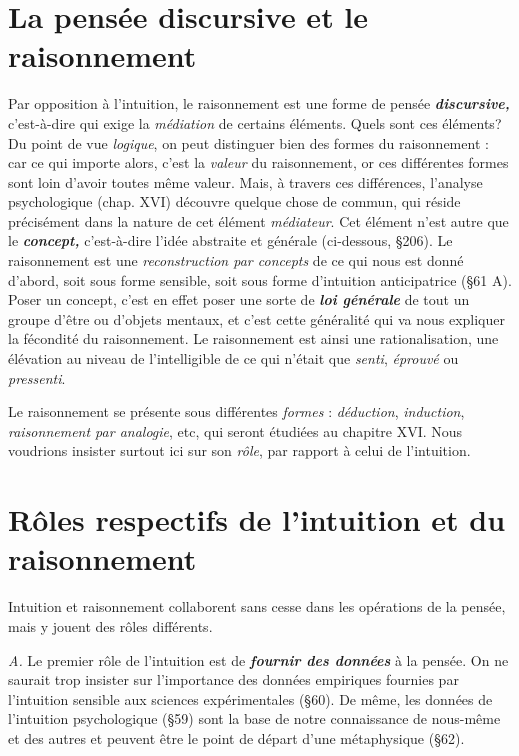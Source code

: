 \section{La pensée discursive et le raisonnement}%
Par opposition
à l'intuition, le raisonnement est une forme de pensée \textbf{\textit {discursive,}}
c’est-à-dire qui exige la {\it médiation} de certains éléments. Quels sont
ces éléments? Du point de vue {\it logique}, on peut distinguer bien des
formes du raisonnement : car ce qui importe alors, c’est la {\it valeur} du
raisonnement, or ces différentes formes sont loin d’avoir toutes même
valeur. Mais, à travers ces différences, l’analyse psychologique
(chap. XVI) découvre quelque chose de commun, qui réside précisément
dans la nature de cet élément {\it médiateur}. Cet élément n’est autre
que le \textbf{\textit {concept,}} c'est-à-dire l’idée abstraite et générale (ci-dessous,
\S 206). Le raisonnement est une {\it reconstruction par concepts} de ce qui
nous est donné d’abord, soit sous forme sensible, soit sous forme d’intuition
anticipatrice (\S 61 A). Poser un concept, c’est en effet poser une
sorte de \textbf{\textit {loi générale}} de tout un groupe d’être ou d’objets mentaux, et
c’est cette généralité qui va nous expliquer la fécondité du raisonnement.
Le raisonnement est ainsi une rationalisation, une élévation au
niveau de l’intelligible de ce qui n’était que {\it senti}, {\it éprouvé} ou {\it pressenti}.

Le raisonnement se présente sous différentes {\it formes} : {\it déduction},
{\it induction}, {\it raisonnement par analogie}, etc, qui seront étudiées au
chapitre XVI. Nous voudrions insister surtout ici sur son {\it rôle}, par
rapport à celui de l'intuition.

\section{Rôles respectifs de l’intuition et du raisonnement}%
Intuition et raisonnement collaborent sans cesse dans les opérations
de la pensée, mais y jouent des rôles différents.

{\it A.} Le premier rôle de l’intuition est de \textbf{\textit {fournir des données}} à la
pensée. On ne saurait trop insister sur l’importance des données
empiriques fournies par l'intuition sensible aux sciences expérimentales
(\S 60). De même, les données de l'intuition psychologique
(\S 59) sont la base de notre connaissance de nous-même et des autres
et peuvent être le point de départ d’une métaphysique (\S 62).

